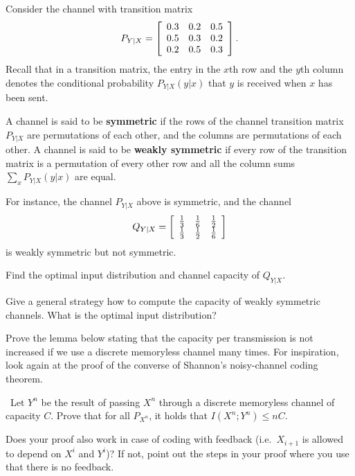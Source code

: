 \documentclass[a4paper,10pt,landscape,twocolumn]{scrartcl}
\begin{document}
\begin{exercise}
Consider the channel with transition matrix
\[
P_{Y|X} = \left[
\begin{array}{c c c}
0.3&0.2&0.5\\
0.5&0.3&0.2\\
0.2&0.5&0.3
\end{array}
\right].
\]
Recall that in a transition matrix, the entry in the $x$th row and the $y$th column denotes the conditional probability $P_{Y|X}(y|x)$ that $y$ is received when $x$ has been sent.

A channel is said to be \textbf{symmetric} if the rows of the channel transition matrix $P_{Y|X}$ are permutations of each other, and the columns are permutations of each other. A channel is said to be \textbf{weakly symmetric} if every row of the transition matrix is a permutation of every other row and all the column sums $\sum_x P_{Y|X}(y|x)$ are equal.

For instance, the channel $P_{Y|X}$ above is symmetric, and the channel
\[
Q_{Y|X} = \left[
\begin{array}{c c c}
\frac{1}{3}&\frac{1}{6}&\frac{1}{2}\\
\frac{1}{3}&\frac{1}{2}&\frac{1}{6}
\end{array}
\right]
\]
is weakly symmetric but not symmetric.
	\begin{subex}
	Find the optimal input distribution and channel capacity of $Q_{Y|X}$.
	\end{subex}
	\begin{subex}
	Give a general strategy how to compute the capacity of weakly symmetric channels. What is the optimal input distribution?
	\end{subex}
\end{exercise}

\begin{exercise}
Prove the lemma below stating that the capacity per transmission is not increased if we use a discrete memoryless channel many times. For inspiration, look again at the proof of the converse of Shannon's noisy-channel coding theorem.

\medskip
{}\  Let $Y^n$ be the result of passing $X^n$ through a discrete memoryless channel of capacity $C$. Prove that for all $P_{X^n}$, it holds that $I(X^n; Y^n) \leq nC$.
\medskip

Does your proof also work in case of coding with feedback (i.e.\ $X_{i+1}$ is allowed to depend on $X^i$ and $Y^i$)? If not, point out the steps in your proof where you use that there is no feedback.
\end{exercise}
\end{document}
